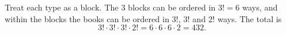 Treat each type as a block. The $3$ blocks can be ordered in $3!=6$ ways, and within the blocks the books can be ordered in $3!$, $3!$ and $2!$ ways. The total is
\[3!\cdot3!\cdot3!\cdot2!=6\cdot6\cdot6\cdot2=\boxed{432}.\]
